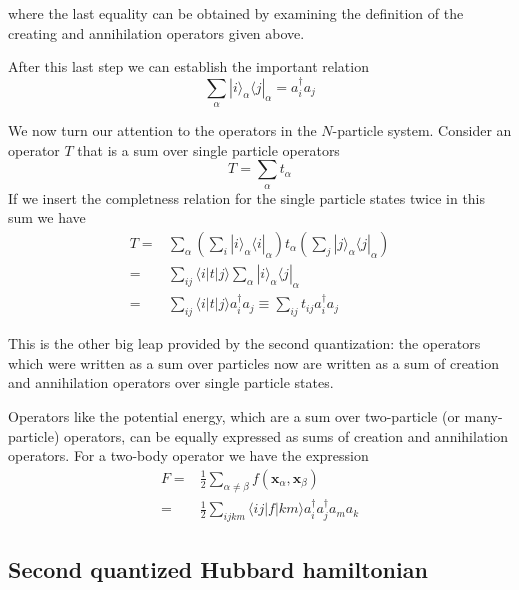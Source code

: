 \documentclass[11pt,letter]{article}
\newcommand{\bv}[1]{\ensuremath{\bm{#1}}}
\begin{document}
where the last equality can be obtained by examining the definition of the creating and annihilation operators given above. 

After this last step we can establish the important relation
\begin{equation}
   \sum_{\alpha} |i\rangle_{\alpha} \langle j | _{\alpha} = 
     a_{i}^{\dagger} a_{j} 
\end{equation}

We now turn our attention to the operators in the $N$-particle system.  Consider an operator $T$ that is a sum over single particle operators 	
\begin{equation}
  T = \sum_{\alpha} t_{\alpha}
\end{equation}  
If we insert the completness relation for the single particle states twice in this sum we have 
\begin{equation}
\begin{split}
  T = & \sum_{\alpha} \left( \sum_{i} |i\rangle_{\alpha}\langle i |_{\alpha} \right)
        t_{\alpha} \left( \sum_{j} |j\rangle_{\alpha}\langle j |_{\alpha} \right) \\
    = & \sum_{ij}   \langle i | t | j \rangle  \sum_{\alpha} |i\rangle_{\alpha} \langle j |_{\alpha} \\ 
    = & \sum_{ij}   \langle i | t | j \rangle a_{i}^{\dagger} a_{j} \equiv \sum_{ij} t_{ij}   a_{i}^{\dagger} a_{j} 
\end{split}  
\end{equation}

This is the other big leap provided by the second quantization:  the operators
which were written as a sum over particles now are written as a sum of creation
and annihilation operators over single particle states.   

Operators like the
potential energy, which are a sum over
two-particle (or many-particle) operators,  can be equally expressed as sums of creation and annihilation operators.  For a two-body operator we have the expression
\begin{equation}
\begin{split}
F = & \frac{1}{2} \sum_{\alpha\neq\beta} f(\bv{x}_{\alpha}, \bv{x}_{\beta} )  \\
  = & \frac{1}{2} \sum_{ijkm} \langle ij | f | km \rangle a_{i}^{\dagger} a_{j}^{\dagger} a_{m} a_{k} 
\end{split}
\end{equation}

\subsection{Second quantized Hubbard hamiltonian}
\end{document}
